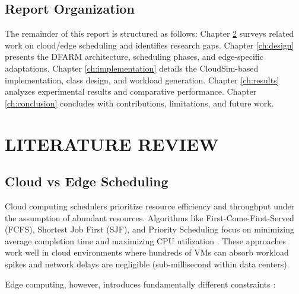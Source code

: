 \documentclass[12pt]{report}
\begin{document}
\section{Report Organization}

The remainder of this report is structured as follows: Chapter \ref{ch:litreview} surveys related work on cloud/edge scheduling and identifies research gaps. Chapter \ref{ch:design} presents the DFARM architecture, scheduling phases, and edge-specific adaptations. Chapter \ref{ch:implementation} details the CloudSim-based implementation, class design, and workload generation. Chapter \ref{ch:results} analyzes experimental results and comparative performance. Chapter \ref{ch:conclusion} concludes with contributions, limitations, and future work.


\chapter{LITERATURE REVIEW}
\label{ch:litreview}

\section{Cloud vs Edge Scheduling}

Cloud computing schedulers prioritize resource efficiency and throughput under the assumption of abundant resources. Algorithms like First-Come-First-Served (FCFS), Shortest Job First (SJF), and Priority Scheduling focus on minimizing average completion time and maximizing CPU utilization \cite{load_balancing_survey_2012}. These approaches work well in cloud environments where hundreds of VMs can absorb workload spikes and network delays are negligible (sub-millisecond within data centers).

Edge computing, however, introduces fundamentally different constraints \cite{edge_survey_2016}:
\end{document}
